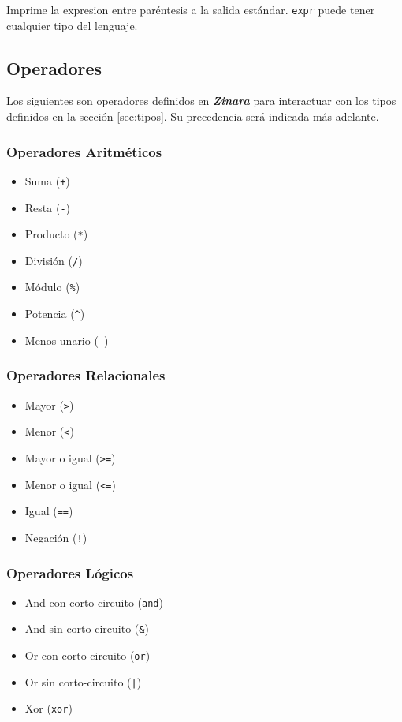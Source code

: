 \documentclass[12pt, spanish]{report}
\begin{document}
Imprime la expresion entre par\'entesis a la salida
est\'andar. \texttt{expr} puede tener cualquier tipo del lenguaje.

\subsection{Operadores}
\label{sec:ops}
Los siguientes son operadores definidos en \emph{\textbf{Zinara}} para
interactuar con los tipos definidos en la secci\'on \ref{sec:tipos}. Su precedencia será indicada más adelante.

\subsubsection{Operadores Aritm\'eticos}
\begin{itemize}
\item Suma (\texttt{+})
\item Resta    (\texttt{-})
\item Producto (\texttt{*})
\item Divisi\'on  (\texttt{/})
\item M\'odulo (\texttt{\%})
\item Potencia (\texttt{\^})
\item Menos unario (\texttt{-})
\end{itemize}

\subsubsection{Operadores Relacionales}
\begin{itemize}
\item Mayor         (\texttt{>})
\item Menor         (\texttt{<})
\item Mayor o igual (\texttt{>=})
\item Menor o igual (\texttt{<=})
\item Igual (\texttt{==})
\item Negaci\'on      (\texttt{!})
\end{itemize}

\subsubsection{Operadores L\'ogicos}
\begin{itemize}
\item And con corto-circuito (\texttt{and})
\item And sin corto-circuito (\texttt{\&})
\item Or con corto-circuito  (\texttt{or})
\item Or sin corto-circuito  (\texttt{|})
\item Xor (\texttt{xor})
\end{itemize}
\end{document}
